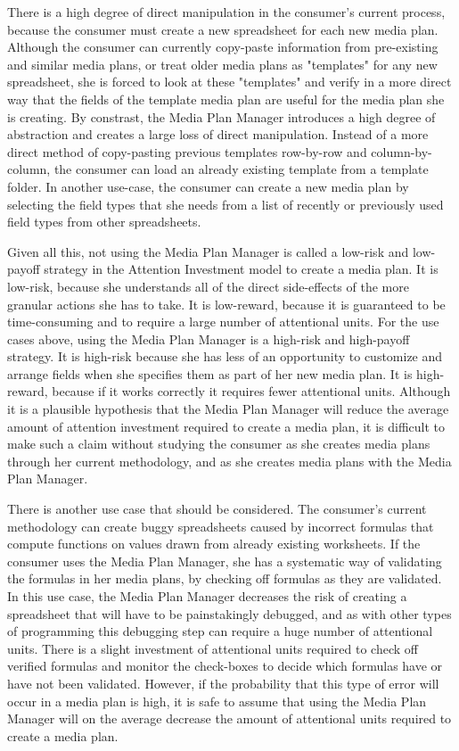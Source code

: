 \documentclass{article}
\begin{document}
	There is a high degree of direct manipulation in the consumer's current process, because the consumer must create a new spreadsheet for each new media plan. Although the consumer can currently copy-paste information from pre-existing and similar media plans, or treat older media plans as "templates" for any new spreadsheet, she is forced to look at these "templates" and verify in a more direct way that the fields of the template media plan are useful for the media plan she is creating. By constrast, the Media Plan Manager introduces a high degree of abstraction and creates a large loss of direct manipulation. Instead of a more direct method of copy-pasting previous templates row-by-row and column-by-column, the consumer can load an already existing template from a template folder. In another use-case, the consumer can create a new media plan by selecting the field types that she needs from a list of recently or previously used field types from other spreadsheets.
	
	Given all this, not using the Media Plan Manager is called a low-risk and low-payoff strategy in the Attention Investment model to create a media plan. It is low-risk, because she understands all of the direct side-effects of the more granular actions she has to take. It is low-reward, because it is guaranteed to be time-consuming and to require a large number of attentional units. For the use cases above, using the Media Plan Manager is a high-risk and high-payoff strategy. It is high-risk because she has less of an opportunity to customize and arrange fields when she specifies them as part of her new media plan. It is high-reward, because if it works correctly it requires fewer attentional units. Although it is a plausible hypothesis that the Media Plan Manager will reduce the average amount of attention investment required to create a media plan, it is difficult to make such a claim without studying the consumer as she creates media plans through her current methodology, and as she creates media plans with the Media Plan Manager.
	
	There is another use case that should be considered. The consumer's current methodology can create buggy spreadsheets caused by incorrect formulas that compute functions on values drawn from already existing worksheets. If the consumer uses the Media Plan Manager, she has a systematic way of validating the formulas in her media plans, by checking off formulas as they are validated. In this use case, the Media Plan Manager decreases the risk of creating a spreadsheet that will have to be painstakingly debugged, and as with other types of programming this debugging step can require a huge number of attentional units. There is a slight investment of attentional units required to check off verified formulas and monitor the check-boxes to decide which formulas have or have not been validated. However, if the probability that this type of error will occur in a media plan is high, it is safe to assume that using the Media Plan Manager will on the average decrease the amount of attentional units required to create a media plan.
	
\end{document}
